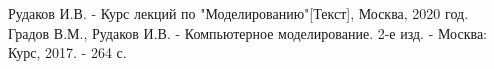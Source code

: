 \newpage
{}

\begin{thebibliography}{}
      Рудаков И.В.  -  Курс лекций по "Моделированию"[Текст], Москва, 2020 год.
      Градов В.М., Рудаков И.В. - Компьютерное моделирование. 2-е изд. - Москва: Курс, 2017. - 264 с.
\end{thebibliography}

